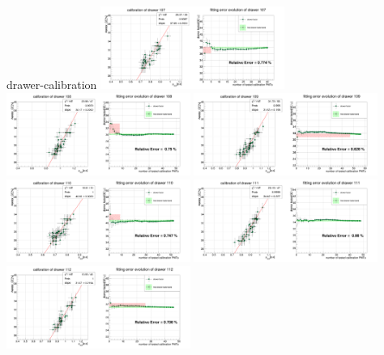 \documentclass[11pt,compress,xcolor=x11names,UTF8]{beamer}
\begin{document}
\begin{frame}{drawer-calibration}
\vspace{-.5cm}
\includegraphics[width=0.45\textwidth]{sta101-6} 
\includegraphics[width=0.45\textwidth]{sta101-7} 
\includegraphics[width=0.45\textwidth]{sta101-8} 
\includegraphics[width=0.45\textwidth]{sta101-9} 
\includegraphics[width=0.45\textwidth]{sta101-10} 
\includegraphics[width=0.45\textwidth]{sta101-11} 
\end{frame}
\end{document}

